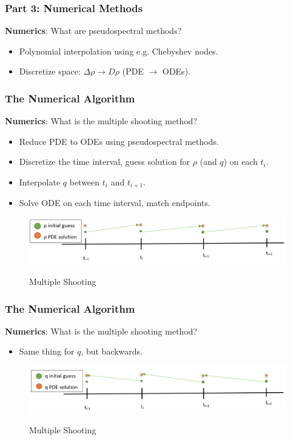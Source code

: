 \documentclass[aspectratio=169,xcolor=dvipsnames]{beamer}
\begin{document}
\begin{frame}
	\frametitle{Part 3: Numerical Methods}
	\textbf{Numerics}: What are pseudospectral methods?\\
	\begin{itemize}
		\item Polynomial interpolation using e.g. Chebyshev nodes.
		\item Discretize space: $\Delta \rho \to D \rho$ (PDE $\to$ ODEs).
	\end{itemize}	
\end{frame}

\begin{frame}
	\frametitle{The Numerical Algorithm}
	\textbf{Numerics}: What is the multiple shooting method?\\
    \begin{itemize}
    	\item Reduce PDE to ODEs using pseudospectral methods.
    	\item Discretize the time interval, guess solution for $\rho$ (and $q$) on each $t_i$.
    	\item Interpolate $q$ between $t_i$ and $t_{i+1}$.
        \item Solve ODE on each time interval, match endpoints.
    \end{itemize}
	\begin{figure}
		\includegraphics[width=12cm]{rhoSol.png}\\
		\caption{Multiple Shooting}
	\end{figure}	
\end{frame}
\begin{frame}
	\frametitle{The Numerical Algorithm}
	\textbf{Numerics}: What is the multiple shooting method?\\
	\begin{itemize}
     \item Same thing for $q$, but backwards. 
	\end{itemize}
	\begin{figure}
		\includegraphics[width=14cm]{qSol.png}\\
		\caption{Multiple Shooting}
	\end{figure}	
\end{frame}
\end{document}
